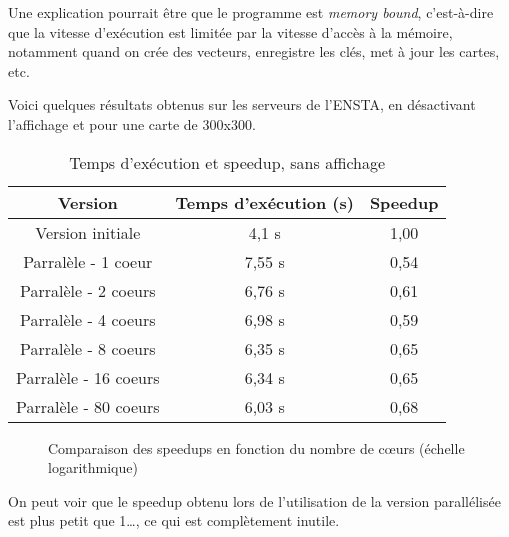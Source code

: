 \documentclass[a4paper, 12pt]{report}
\begin{document}
Une explication pourrait être que le programme est \emph{memory bound}, c'est-à-dire que la vitesse d'exécution est limitée par la vitesse d'accès à la mémoire, notamment quand on crée des vecteurs, enregistre les clés, met à jour les cartes, etc.

Voici quelques résultats obtenus sur les serveurs de l'ENSTA, en désactivant l'affichage et pour une carte de 300x300.

\begin{table}[H]
  \centering
  \begin{tabular}{|c|c|c|}
    \hline
    Version               & Temps d'exécution (s) & Speedup \\ \hline
    Version initiale      & 4,1 s                 & 1,00    \\ \hline
    Parralèle - 1 coeur   & 7,55 s                & 0,54    \\ \hline
    Parralèle - 2 coeurs  & 6,76 s                & 0,61    \\ \hline
    Parralèle - 4 coeurs  & 6,98 s                & 0,59    \\ \hline
    Parralèle - 8 coeurs  & 6,35 s                & 0,65    \\ \hline
    Parralèle - 16 coeurs & 6,34 s                & 0,65    \\ \hline
    Parralèle - 80 coeurs & 6,03 s                & 0,68    \\ \hline
  \end{tabular}
  \caption{Temps d'exécution et speedup, sans affichage}
  \label{tab:execution_times}
\end{table}



\begin{figure}[H]
  \centering
  \caption{Comparaison des speedups en fonction du nombre de cœurs (échelle logarithmique)}
  \label{fig:execution_plot}
\end{figure}



On peut voir que le speedup obtenu lors de l'utilisation de la version parallélisée est plus petit que 1\dots, ce qui est complètement inutile.
\end{document}
